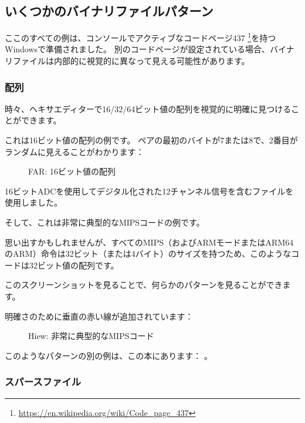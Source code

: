
\subsection{いくつかのバイナリファイルパターン}

ここのすべての例は、コンソールでアクティブなコードページ437
\footnote{\url{https://en.wikipedia.org/wiki/Code_page_437}}を持つWindowsで準備されました。
別のコードページが設定されている場合、バイナリファイルは内部的に視覚的に異なって見える可能性があります。

\clearpage
\subsubsection{配列}

時々、ヘキサエディターで16/32/64ビット値の配列を視覚的に明確に見つけることができます。

これは16ビット値の配列の例です。
ペアの最初のバイトが7または8で、2番目がランダムに見えることがわかります：

\begin{figure}[H]
\centering
{}
\caption{FAR: 16ビット値の配列}
\end{figure}

16ビット\ac{ADC}を使用してデジタル化された12チャンネル信号を含むファイルを使用しました。

\clearpage
{}
\par そして、これは非常に典型的なMIPSコードの例です。

思い出すかもしれませんが、すべてのMIPS（およびARMモードまたはARM64のARM）命令は32ビット（または4バイト）のサイズを持つため、このようなコードは32ビット値の配列です。

このスクリーンショットを見ることで、何らかのパターンを見ることができます。

明確さのために垂直の赤い線が追加されています：

\begin{figure}[H]
\centering
{}
\caption{Hiew: 非常に典型的なMIPSコード}
\end{figure}

このようなパターンの別の例は、この本にあります：
。

\clearpage
\subsubsection{スパースファイル}

